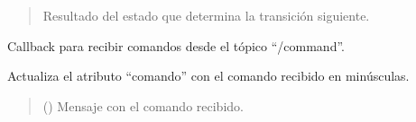 \documentclass[a4paper,10pt,spanish]{sphinxmanual}
\begin{document}
\begin{fulllineitems}
\begin{fulllineitems}
\begin{quote}
\begin{description}
\sphinxAtStartPar
Resultado del estado que determina la transición siguiente.

\sphinxAtStartPar
{}

\end{description}\end{quote}

\end{fulllineitems}


\begin{fulllineitems}
\label{\detokenize{squad_state_manager:squad_state_manager.BaseState.state_callback}}
\pysigstartsignatures
{}
\pysigstopsignatures
\sphinxAtStartPar
Callback para recibir comandos desde el tópico “/command”.

\sphinxAtStartPar
Actualiza el atributo “comando” con el comando recibido en minúsculas.
\begin{quote}\begin{description}
\sphinxAtStartPar
{} () \textendash{} Mensaje con el comando recibido.

\end{description}\end{quote}

\end{fulllineitems}


\end{fulllineitems}

\end{document}
